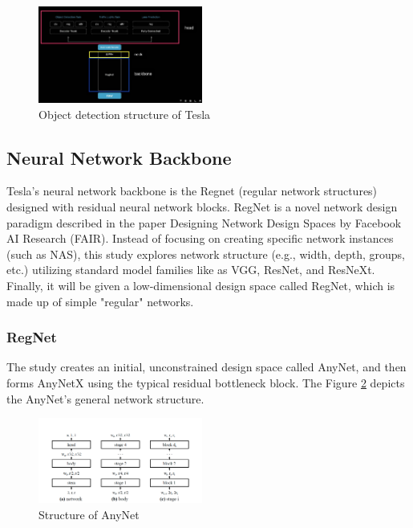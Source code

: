 \documentclass[letterpaper, 10 pt, conference]{ieeeconf}  %
\begin{document}
\begin{figure}[hbt!]
\centering
\includegraphics[width=0.48\textwidth]{gfx/tesla_detection_structure.png}
\caption{Object detection structure of Tesla}
\label{tesla_detection_structure}
\end{figure}

\subsection{Neural Network Backbone}
Tesla's neural network backbone is the Regnet (regular network structures) designed with residual neural network blocks. RegNet is a novel network design paradigm described in the paper Designing Network Design Spaces by Facebook AI Research (FAIR). Instead of focusing on creating specific network instances (such as NAS), this study explores network structure (e.g., width, depth, groups, etc.) utilizing standard model families like as VGG, ResNet, and ResNeXt. Finally, it will be given a low-dimensional design space called RegNet, which is made up of simple "regular" networks.

\subsubsection{RegNet}
The study creates an initial, unconstrained design space called AnyNet, and then forms AnyNetX using the typical residual bottleneck block\cite{regnet}. The Figure \ref{anynet} depicts the AnyNet's general network structure.

\begin{figure}[hbt!]
\centering
\includegraphics[width=0.48\textwidth]{gfx/AnyNet.png}
\caption{Structure of AnyNet}
\label{anynet}
\end{figure}
\end{document}
